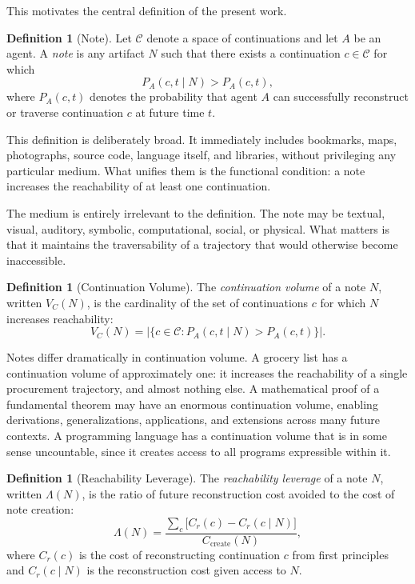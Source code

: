 \documentclass[12pt, a4paper]{article}
\theoremstyle{plain}
\theoremstyle{definition}
\newtheorem{definition}[theorem]{Definition}
\theoremstyle{remark}
\begin{document}
This motivates the central definition of the present work.

\begin{definition}[Note]
Let $\mathcal{C}$ denote a space of continuations and let $A$ be an agent. A
\emph{note} is any artifact $N$ such that there exists a continuation
$c \in \mathcal{C}$ for which
\[
P_A(c, t \mid N) > P_A(c, t),
\]
where $P_A(c, t)$ denotes the probability that agent $A$ can successfully
reconstruct or traverse continuation $c$ at future time $t$.
\end{definition}

This definition is deliberately broad. It immediately includes bookmarks, maps,
photographs, source code, language itself, and libraries, without privileging any
particular medium. What unifies them is the functional condition: a note increases
the reachability of at least one continuation.

The medium is entirely irrelevant to the definition. The note may be textual,
visual, auditory, symbolic, computational, social, or physical. What matters is
that it maintains the traversability of a trajectory that would otherwise become
inaccessible.

\begin{definition}[Continuation Volume]
The \emph{continuation volume} of a note $N$, written $V_C(N)$, is the cardinality
of the set of continuations $c$ for which $N$ increases reachability:
\[
V_C(N) = \bigl|\{c \in \mathcal{C} : P_A(c, t \mid N) > P_A(c, t)\}\bigr|.
\]
\end{definition}

Notes differ dramatically in continuation volume. A grocery list has a continuation
volume of approximately one: it increases the reachability of a single procurement
trajectory, and almost nothing else. A mathematical proof of a fundamental theorem
may have an enormous continuation volume, enabling derivations, generalizations,
applications, and extensions across many future contexts. A programming language
has a continuation volume that is in some sense uncountable, since it creates
access to all programs expressible within it.

\begin{definition}[Reachability Leverage]
The \emph{reachability leverage} of a note $N$, written $\Lambda(N)$, is the ratio
of future reconstruction cost avoided to the cost of note creation:
\[
\Lambda(N) = \frac{\sum_{c} \bigl[C_r(c) - C_r(c \mid N)\bigr]}{C_{\text{create}}(N)},
\]
where $C_r(c)$ is the cost of reconstructing continuation $c$ from first
principles and $C_r(c \mid N)$ is the reconstruction cost given access to $N$.
\end{definition}
\end{document}
